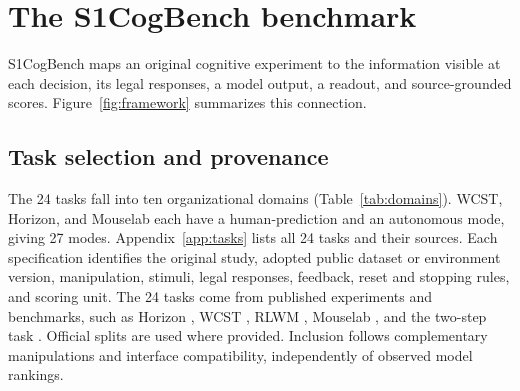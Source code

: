\documentclass[11pt,a4paper]{article}
\newcommand{\bench}{S1CogBench}
\begin{document}
\section{The \bench{} benchmark}
\label{sec:benchmark}
\bench{} maps an original cognitive experiment to the information visible at each decision, its legal responses, a model output, a readout, and source-grounded scores. Figure~\ref{fig:framework} summarizes this connection.

\subsection{Task selection and provenance}
The 24 tasks fall into ten organizational domains (Table~\ref{tab:domains}). WCST, Horizon, and Mouselab each have a human-prediction and an autonomous mode, giving 27 modes. Appendix~\ref{app:tasks} lists all 24 tasks and their sources. Each specification identifies the original study, adopted public dataset or environment version, manipulation, stimuli, legal responses, feedback, reset and stopping rules, and scoring unit. The 24 tasks come from published experiments and benchmarks, such as Horizon \citep{wilson2014exploration}, WCST \citep{grant1948cardsorting}, RLWM \citep{collins2012rlwm}, Mouselab \citep{callaway2022planning}, and the two-step task \citep{daw2011model}. Official splits are used where provided. Inclusion follows complementary manipulations and interface compatibility, independently of observed model rankings.
\end{document}
